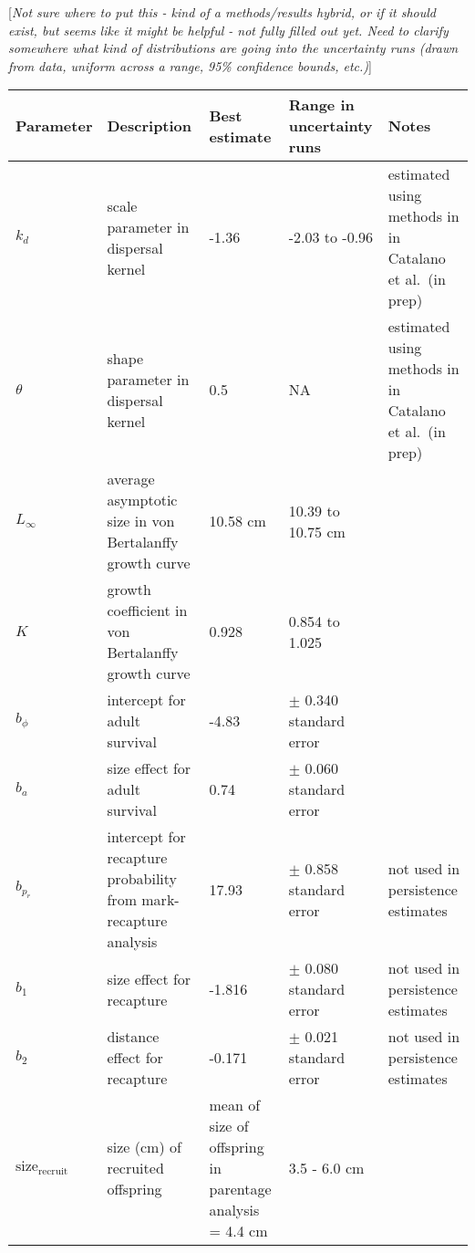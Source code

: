 \documentclass[12pt, oneside]{article}   	%
\begin{document}


[\textit{Not sure where to put this - kind of a methods/results hybrid, or if it should exist, but seems like it might be helpful - not fully filled out yet. Need to clarify somewhere what kind of distributions are going into the uncertainty runs (drawn from data, uniform across a range, 95\% confidence bounds, etc.)}]
\begin{centering}
\begin{longtable}{|p{0.8in}|p{1.2in}|p{1.5in}|p{1in}|p{1.5in}|}
\hline 
\textbf{Parameter} & \textbf{Description} & \textbf{Best estimate} & \textbf{Range in uncertainty runs} & \textbf{Notes} \\ \hline
$k_d$ & scale parameter in dispersal kernel & -1.36 & -2.03 to -0.96 & estimated using methods in \cite{bode2018estimating} in Catalano et al.\ (in prep) \\ \hline
$\theta$ & shape parameter in dispersal kernel & 0.5 & NA & estimated using methods in \cite{bode2018estimating} in Catalano et al.\ (in prep) \\ \hline
$L_\infty$ & average asymptotic size in von Bertalanffy growth curve & 10.58 cm & 10.39 to 10.75 cm &  \\ \hline
$K$ & growth coefficient in von Bertalanffy growth curve &  0.928 & 0.854 to 1.025 & \\ \hline  
$b_\phi$ & intercept for adult survival & -4.83 & $\pm$ 0.340 standard error & \\ \hline
$b_a$ & size effect for adult survival & 0.74 & $\pm$ 0.060 standard error & \\ \hline
$b_{p_r}$ & intercept for recapture probability from mark-recapture analysis & 17.93 & $\pm$ 0.858 standard error & not used in persistence estimates \\ \hline
$b_1$ & size effect for recapture & -1.816 & $\pm$ 0.080 standard error & not used in persistence estimates \\ \hline
$b_2$ & distance effect for recapture & -0.171 & $\pm$ 0.021 standard error & not used in persistence estimates \\ \hline
$\text{size}_\text{recruit}$ & size (cm) of recruited offspring & mean of size of offspring in parentage analysis = 4.4 cm & 3.5 - 6.0 cm & \\ \hline

\end{longtable}
\end{centering}
\end{document}
